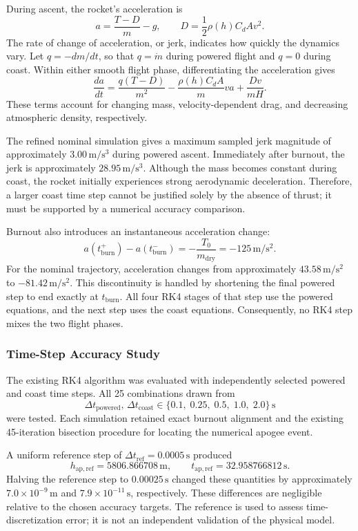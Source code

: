 \documentclass{article}
\begin{document}
During ascent, the rocket's acceleration is
\[
a=\frac{T-D}{m}-g,
\qquad
D=\frac{1}{2}\rho(h)C_dAv^2.
\]
The rate of change of acceleration, or jerk, indicates how quickly the
dynamics vary. Let $q=-dm/dt$, so that $q=\dot{m}$ during powered
flight and $q=0$ during coast. Within either smooth flight phase,
differentiating the acceleration gives
\[
\frac{da}{dt}
=
\frac{q(T-D)}{m^2}
-\frac{\rho(h)C_dA}{m}va
+\frac{Dv}{mH}.
\]
These terms account for changing mass, velocity-dependent drag, and
decreasing atmospheric density, respectively.

The refined nominal simulation gives a maximum sampled jerk magnitude
of approximately $3.00\,\mathrm{m/s^3}$ during powered ascent. Immediately
after burnout, the jerk is approximately $28.95\,\mathrm{m/s^3}$.
Although the mass becomes constant during coast, the rocket initially
experiences strong aerodynamic deceleration. Therefore, a larger coast
time step cannot be justified solely by the absence of thrust; it must
be supported by a numerical accuracy comparison.

Burnout also introduces an instantaneous acceleration change:
\[
a(t_{\mathrm{burn}}^+)-a(t_{\mathrm{burn}}^-)
=-\frac{T_0}{m_{\mathrm{dry}}}
=-125\,\mathrm{m/s^2}.
\]
For the nominal trajectory, acceleration changes from approximately
$43.58\,\mathrm{m/s^2}$ to $-81.42\,\mathrm{m/s^2}$.
This discontinuity is handled by shortening the final powered step
to end exactly at $t_{\mathrm{burn}}$. All four RK4 stages of that
step use the powered equations, and the next step uses the coast
equations. Consequently, no RK4 step mixes the two flight phases.

\subsubsection{Time-Step Accuracy Study}

The existing RK4 algorithm was evaluated with independently selected
powered and coast time steps. All 25 combinations drawn from
\[
\Delta t_{\mathrm{powered}},\,
\Delta t_{\mathrm{coast}}
\in
\{0.1,\;0.25,\;0.5,\;1.0,\;2.0\}\,\mathrm{s}
\]
were tested. Each simulation retained exact burnout alignment and
the existing 45-iteration bisection procedure for locating the
numerical apogee event.

A uniform reference step of
$\Delta t_{\mathrm{ref}}=0.0005\,\mathrm{s}$ produced
\[
h_{\mathrm{ap,ref}}=5806.866708\,\mathrm{m},
\qquad
t_{\mathrm{ap,ref}}=32.958766812\,\mathrm{s}.
\]
Halving the reference step to $0.00025\,\mathrm{s}$ changed these
quantities by approximately $7.0\times10^{-9}\,\mathrm{m}$ and
$7.9\times10^{-11}\,\mathrm{s}$, respectively. These differences
are negligible relative to the chosen accuracy targets. The reference
is used to assess time-discretization error; it is not an independent
validation of the physical model.
\end{document}
